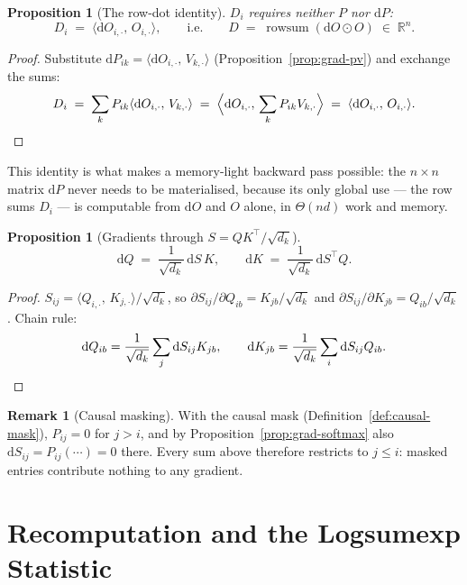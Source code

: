\documentclass[11pt]{amsart}
\theoremstyle{plain}
\newtheorem{proposition}[theorem]{Proposition}
\theoremstyle{definition}
\newtheorem{remark}[theorem]{Remark}
\newcommand{\R}{\mathbb{R}}
\DeclareMathOperator{\rowsum}{rowsum}
\newcommand{\inner}[2]{\langle #1,\, #2 \rangle}
\begin{document}
\begin{proposition}[The row-dot identity]
\label{prop:row-dot}
$D_i$ requires neither $P$ nor $\mathrm{d}P$:
\[
    D_i \;=\; \inner{\mathrm{d}O_{i,\cdot}}{O_{i,\cdot}},
    \qquad\text{i.e.}\qquad
    D \;=\; \rowsum(\mathrm{d}O \odot O) \;\in\; \R^n.
\]
\end{proposition}
\begin{proof}
Substitute $\mathrm{d}P_{ik} = \inner{\mathrm{d}O_{i,\cdot}}{V_{k,\cdot}}$
(Proposition~\ref{prop:grad-pv}) and exchange the sums:
\[
    D_i
    \;=\; \sum_k P_{ik} \inner{\mathrm{d}O_{i,\cdot}}{V_{k,\cdot}}
    \;=\; \Bigl\langle \mathrm{d}O_{i,\cdot},\,
          \sum_k P_{ik} V_{k,\cdot} \Bigr\rangle
    \;=\; \inner{\mathrm{d}O_{i,\cdot}}{O_{i,\cdot}}.
    \qedhere
\]
\end{proof}

This identity is what makes a memory-light backward pass possible: the
$n \times n$ matrix $\mathrm{d}P$ never needs to be materialised, because its
only global use — the row sums $D_i$ — is computable from $\mathrm{d}O$ and
$O$ alone, in $\Theta(nd)$ work and memory.

\begin{proposition}[Gradients through $S = QK^\top/\sqrt{d_k}$]
\label{prop:grad-scores}
\[
    \mathrm{d}Q \;=\; \frac{1}{\sqrt{d_k}}\, \mathrm{d}S\, K,
    \qquad
    \mathrm{d}K \;=\; \frac{1}{\sqrt{d_k}}\, \mathrm{d}S^\top Q.
\]
\end{proposition}
\begin{proof}
$S_{ij} = \inner{Q_{i,\cdot}}{K_{j,\cdot}}/\sqrt{d_k}$, so
$\partial S_{ij}/\partial Q_{ib} = K_{jb}/\sqrt{d_k}$ and
$\partial S_{ij}/\partial K_{jb} = Q_{ib}/\sqrt{d_k}$.  Chain rule:
\[
    \mathrm{d}Q_{ib} = \frac{1}{\sqrt{d_k}} \sum_j \mathrm{d}S_{ij} K_{jb},
    \qquad
    \mathrm{d}K_{jb} = \frac{1}{\sqrt{d_k}} \sum_i \mathrm{d}S_{ij} Q_{ib}.
    \qedhere
\]
\end{proof}

\begin{remark}[Causal masking]
With the causal mask (Definition~\ref{def:causal-mask}), $P_{ij} = 0$ for
$j > i$, and by Proposition~\ref{prop:grad-softmax} also
$\mathrm{d}S_{ij} = P_{ij}(\cdots) = 0$ there.  Every sum above therefore
restricts to $j \leq i$: masked entries contribute nothing to any gradient.
\end{remark}

\section{Recomputation and the Logsumexp Statistic}
\label{sec:logsumexp-statistic}
\end{document}
